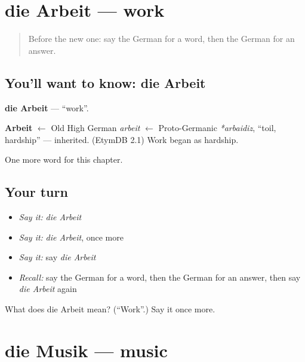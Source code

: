 \section[die Arbeit]{die Arbeit — work}

\label{lesson:GE-C102-arbeit}



\begin{quote}
Before the new one: say the German for a word, then the German for an answer.
\end{quote}

\subsection*{You'll want to know: die Arbeit}
\textbf{die Arbeit} — \textquotedblleft{}work\textquotedblright{}.

\begin{cousinweb}
\textbf{Arbeit} $\leftarrow$ Old High German \emph{arbeit} $\leftarrow$ Proto-Germanic \emph{*arbaidiz}, \textquotedblleft{}toil, hardship\textquotedblright{} — inherited. (EtymDB 2.1) Work began as hardship.
\end{cousinweb}

\begin{grammarlens}[title={What you've built}]
One more word for this chapter.
\end{grammarlens}

\subsection*{Your turn}
\begin{itemize}
\raggedright
  \item \emph{Say it:} \emph{die Arbeit}
  \item \emph{Say it:} \emph{die Arbeit}, once more
  \item \emph{Say it:} say \emph{die Arbeit}
  \item \emph{Recall:} say the German for a word, then the German for an answer, then say \emph{die Arbeit} again
\end{itemize}

\begin{tcolorbox}[breakable,colback=teal!4,colframe=teal!35!black,title={Before you move on}]
What does die Arbeit mean? (\textquotedblleft{}Work\textquotedblright{}.) Say it once more.
\end{tcolorbox}
\section[die Musik]{die Musik — music}

